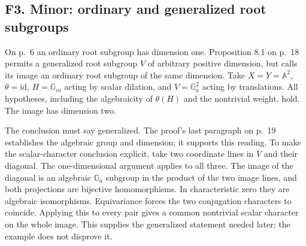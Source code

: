 \documentclass[10pt]{article}
\begin{document}
\subsection*{F3. Minor: ordinary and generalized root subgroups}
On p. 6 an ordinary root subgroup has dimension one. Proposition 8.1 on p. 18 permits a generalized root subgroup \(V\) of arbitrary positive dimension, but calls its image an ordinary root subgroup of the same dimension. Take \(X=Y=\mathbb A^2\), \(\theta=\mathrm{id}\), \(H=\mathbb G_m\) acting by scalar dilation, and \(V=\mathbb G_a^2\) acting by translations. All hypotheses, including the algebraicity of \(\theta(H)\) and the nontrivial weight, hold. The image has dimension two.\par
The conclusion must say generalized. The proof’s last paragraph on p. 19 establishes the algebraic group and dimension; it supports this reading. To make the scalar-character conclusion explicit, take two coordinate lines in \(V\) and their diagonal. The one-dimensional argument applies to all three. The image of the diagonal is an algebraic \(\mathbb G_a\) subgroup in the product of the two image lines, and both projections are bijective homomorphisms. In characteristic zero they are algebraic isomorphisms. Equivariance forces the two conjugation characters to coincide. Applying this to every pair gives a common nontrivial scalar character on the whole image. This supplies the generalized statement needed later; the example does not disprove it.\par
\end{document}
